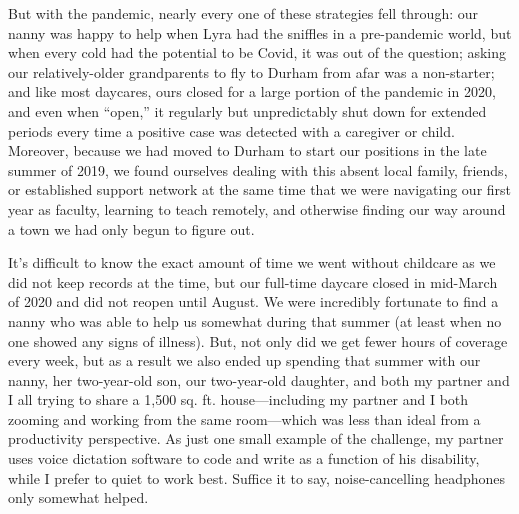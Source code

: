 \documentclass[11pt]{article}
\begin{document}
But with the pandemic, nearly every one of these strategies fell through: our nanny was happy to help when Lyra had the sniffles in a pre-pandemic world, but when every cold had the potential to be Covid, it was out of the question; asking our relatively-older grandparents to fly to Durham from afar was a non-starter; and like most daycares, ours closed for a large portion of the pandemic in 2020, and even when ``open,'' it regularly but unpredictably shut down for extended periods every time a positive case was detected with a caregiver or child.   Moreover, because we had moved to Durham to start our positions in the late summer of 2019, we found ourselves dealing with this absent local family, friends, or established support network at the same time that we were navigating our first year as faculty, learning to teach remotely, and otherwise finding our way around a town we had only begun to figure out.

It's difficult to know the exact amount of time we went without childcare as we did not keep records at the time, but our full-time daycare closed in mid-March of 2020 and did not reopen until August. We were incredibly fortunate to find a nanny who was able to help us somewhat during that summer (at least when no one showed any signs of illness).  But, not only did we get fewer hours of coverage every week, but as a result we also ended up spending that summer with our nanny, her two-year-old son, our two-year-old daughter, and both my partner and I all trying to share a 1,500 sq. ft. house---including my partner and I both zooming and working from the same room---which was less than ideal from a productivity perspective.  As just one small example of the challenge, my partner uses voice dictation software to code and write as a function of his disability, while I prefer to quiet to work best.  Suffice it to say, noise-cancelling headphones only somewhat helped.
\end{document}
